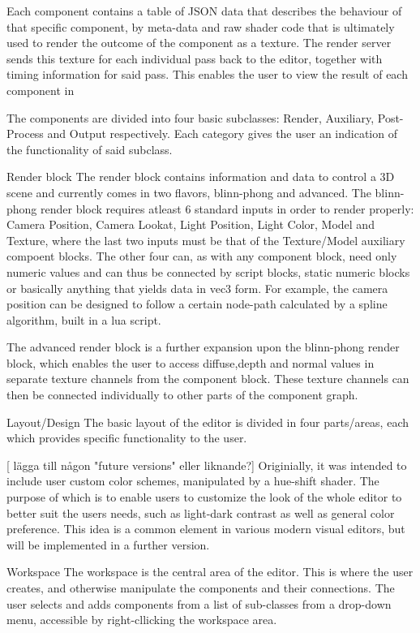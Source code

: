 Each component contains a table of JSON data that describes the behaviour of that specific component, by meta-data and raw shader code that is ultimately used to render the outcome of the component as a texture. The render server sends this texture for each individual pass back to the editor, together with timing information for said pass. This enables the user to view the result of each component in 

The components are divided into four basic subclasses: Render, Auxiliary, Post-Process and Output respectively. Each category 
gives the user an indication of the functionality of said subclass. 

Render block
The render block contains information and data to control a 3D scene and currently comes in two flavors, blinn-phong and advanced. The blinn-phong render block requires atleast 6 standard inputs in order to render properly: Camera Position, Camera Lookat, Light Position, Light Color, Model and Texture, where the last two inputs must be that of the Texture/Model auxiliary compoent blocks. The other four can, as with any component block, need only numeric values and can thus be connected by script blocks, static numeric blocks or basically anything that yields data in vec3 form. For example, the camera position can be designed to follow a certain node-path calculated by a spline algorithm, built in a lua script. 

The advanced render block is a further expansion upon the blinn-phong render block, which enables the user to access diffuse,depth  and normal values in separate texture channels from the component block. These texture channels can then be connected individually to other parts of the component graph. 

Layout/Design
The basic layout of the editor is divided in four parts/areas, each which provides specific functionality to the user. 

[ lägga till någon "future versions" eller liknande?]
Originially, it was intended to include user custom color schemes, manipulated by a hue-shift shader. The purpose of which is to enable users to customize the look of the whole editor to better suit the users needs, such as light-dark contrast as well as general color preference. This idea is a common element in various modern visual editors, but will be implemented in a further version. 

Workspace
The workspace is the central area of the editor. This is where the user creates, and otherwise manipulate the components and their connections. The user selects and adds components from a list of sub-classes from a drop-down menu, accessible by right-cllicking the workspace area. 

